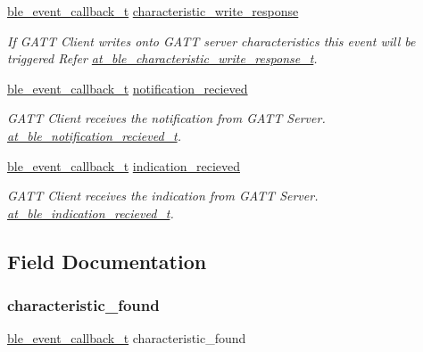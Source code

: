 \begin{DoxyCompactItemize}
\mbox{\hyperlink{ble__manager_8h_a04ce4bb8cb8282f2762e3924b1773cc9}{ble\+\_\+event\+\_\+callback\+\_\+t}} \mbox{\hyperlink{structble__gatt__client__event__cb_a56ba53f48eabaee0c1e0112761650f31}{characteristic\+\_\+write\+\_\+response}}
\begin{DoxyCompactList}\small\item\em If G\+A\+TT Client writes onto G\+A\+TT server characteristics this event will be triggered Refer \mbox{\hyperlink{structat__ble__characteristic__write__response__t}{at\+\_\+ble\+\_\+characteristic\+\_\+write\+\_\+response\+\_\+t}}. \end{DoxyCompactList}\item 
\mbox{\hyperlink{ble__manager_8h_a04ce4bb8cb8282f2762e3924b1773cc9}{ble\+\_\+event\+\_\+callback\+\_\+t}} \mbox{\hyperlink{structble__gatt__client__event__cb_ab7b825b35a5ff72e4dfdc67cf4033de7}{notification\+\_\+recieved}}
\begin{DoxyCompactList}\small\item\em G\+A\+TT Client receives the notification from G\+A\+TT Server. \mbox{\hyperlink{structat__ble__notification__recieved__t}{at\+\_\+ble\+\_\+notification\+\_\+recieved\+\_\+t}}. \end{DoxyCompactList}\item 
\mbox{\hyperlink{ble__manager_8h_a04ce4bb8cb8282f2762e3924b1773cc9}{ble\+\_\+event\+\_\+callback\+\_\+t}} \mbox{\hyperlink{structble__gatt__client__event__cb_a0d5f5f9e4cf80206d91a6b0ad93145dd}{indication\+\_\+recieved}}
\begin{DoxyCompactList}\small\item\em G\+A\+TT Client receives the indication from G\+A\+TT Server. \mbox{\hyperlink{structat__ble__indication__recieved__t}{at\+\_\+ble\+\_\+indication\+\_\+recieved\+\_\+t}}. \end{DoxyCompactList}\end{DoxyCompactItemize}


\subsection{Field Documentation}
\mbox{\label{structble__gatt__client__event__cb_aed7efe1ec5c627556016aebdef73a002}} 
\subsubsection{\texorpdfstring{characteristic\_found}{characteristic\_found}}
{\footnotesize\ttfamily \mbox{\hyperlink{ble__manager_8h_a04ce4bb8cb8282f2762e3924b1773cc9}{ble\+\_\+event\+\_\+callback\+\_\+t}} characteristic\+\_\+found}



